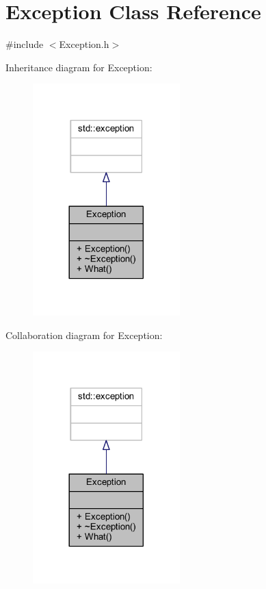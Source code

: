 \hypertarget{class_exception}{}\section{Exception Class Reference}
\label{class_exception}


{\ttfamily \#include $<$Exception.\+h$>$}



Inheritance diagram for Exception\+:
\nopagebreak
\begin{figure}[H]
\begin{center}
\leavevmode
\includegraphics[width=161pt]{class_exception__inherit__graph}
\end{center}
\end{figure}


Collaboration diagram for Exception\+:
\nopagebreak
\begin{figure}[H]
\begin{center}
\leavevmode
\includegraphics[width=161pt]{class_exception__coll__graph}
\end{center}
\end{figure}
